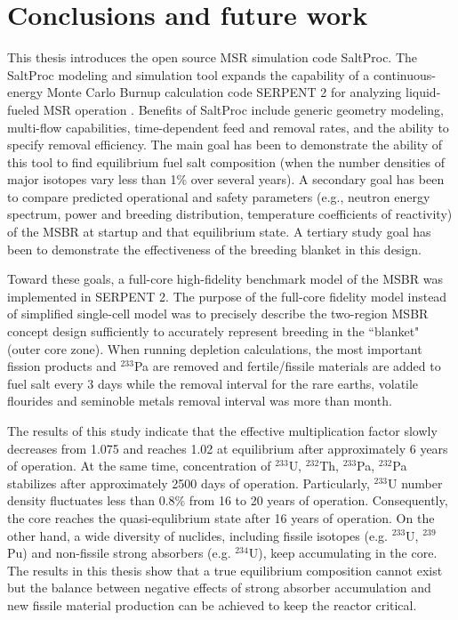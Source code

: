 \chapter[Conclusions and furture work]{Conclusions and future work}
This thesis introduces the open source \gls{MSR} simulation code SaltProc. The SaltProc modeling and simulation tool expands the capability of a continuous-energy Monte Carlo Burnup calculation code SERPENT 2 for analyzing liquid-fueled \gls{MSR} operation \cite{andrei_rykhlevskii_arfc/saltproc:_2018}. Benefits of SaltProc include generic geometry modeling, multi-flow capabilities, time-dependent feed and removal rates, and the ability to specify removal efficiency. The main goal has been to demonstrate the ability of this tool to find equilibrium fuel salt composition (when the number densities of major isotopes vary less than 1\% over several years). A secondary goal has been to compare predicted operational and safety parameters (e.g., neutron energy spectrum, power and breeding distribution, temperature coefficients of reactivity) of the \gls{MSBR} at startup and that equilibrium state. A tertiary study goal has been to demonstrate the effectiveness of the breeding blanket in this design.

Toward these goals, a full-core high-fidelity benchmark model of the \gls{MSBR} was implemented in SERPENT 2. The purpose of the full-core fidelity model instead of simplified single-cell model \cite{rykhlevskii_online_2017, betzler_molten_2017} was to precisely describe the two-region \gls{MSBR} concept design sufficiently to accurately represent breeding in the ``blanket" (outer core zone). When running depletion calculations, the most important fission products and $^{233}$Pa are removed and fertile/fissile materials are added to fuel salt every 3 days while the removal interval for the rare earths, volatile flourides and seminoble metals removal interval was more than month. 

The results of this study indicate that the effective multiplication factor slowly decreases from 1.075 and reaches 1.02 at equilibrium after approximately 6 years of operation. At the same time, concentration of $^{233}$U, $^{232}$Th, $^{233}$Pa, $^{232}$Pa stabilizes after approximately 2500 days of operation. Particularly, $^{233}$U number density fluctuates less than 0.8\% from 16 to 20 years of operation. Consequently, the core reaches the quasi-equlibrium state after 16 years of operation. On the other hand, a wide diversity of nuclides, including fissile isotopes (e.g. $^{233}$U, $^{239}$Pu) and non-fissile strong absorbers (e.g. $^{234}$U), keep accumulating in the core. The results in this thesis show that a true equilibrium composition cannot exist but the balance between negative effects of strong absorber accumulation and new fissile material production can be achieved to keep the reactor critical.

